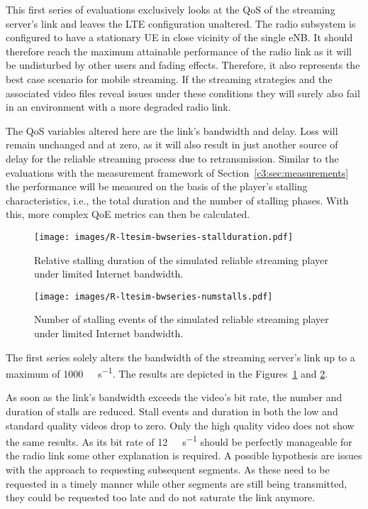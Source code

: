 This first series of evaluations exclusively looks at the \gls{QoS} of the streaming server's link and leaves the \gls{LTE} configuration unaltered. The radio subsystem is configured to have a stationary \gls{UE} in close vicinity of the single \gls{eNB}. It should therefore reach the maximum attainable performance of the radio link as it will be undisturbed by other users and fading effects. Therefore, it also represents the best case scenario for mobile streaming. If the streaming strategies and the associated video files reveal issues under these conditions they will surely also fail in an environment with a more degraded radio link.

The \gls{QoS} variables altered here are the link's bandwidth and delay. Loss will remain unchanged and at zero, as it will also result in just another source of delay for the reliable streaming process due to retransmission. Similar to the evaluations with the measurement framework of Section~\ref{c3:sec:measurements} the performance will be measured on the basis of the player's stalling characteristics, i.e., the total duration and the number of stalling phases. With this, more complex \gls{QoE} metrics can then be calculated.

\begin{figure}[htbp]
	\centering
	\texttt{[image: images/R-ltesim-bwseries-stallduration.pdf]}
	\caption{Relative stalling duration of the simulated reliable streaming player under limited Internet bandwidth.}
\label{c6:fig:ltesim-bwseries-stallduration}
\end{figure}

\begin{figure}[htbp]
	\centering
	\texttt{[image: images/R-ltesim-bwseries-numstalls.pdf]}
	\caption{Number of stalling events of the simulated reliable streaming player under limited Internet bandwidth.}
\label{c6:fig:ltesim-bwseries-numstalls}
\end{figure}

The first series solely alters the bandwidth of the streaming server's link up to a maximum of \SI{1000}{\mega\bit\per\second}. The results are depicted in the Figures~\ref{c6:fig:ltesim-bwseries-stallduration} and \ref{c6:fig:ltesim-bwseries-numstalls}.

As soon as the link's bandwidth exceeds the video's bit rate, the number and duration of stalls are reduced. Stall events and duration in both the low and standard quality videos drop to zero. Only the high quality video does not show the same results. As its bit rate of \SI{12}{\mega\bit\per\second} should be perfectly manageable for the radio link some other explanation is required. A possible hypothesis are issues with the approach to requesting subsequent segments. As these need to be requested in a timely manner while other segments are still being transmitted, they could be requested too late and do not saturate the link anymore. 

